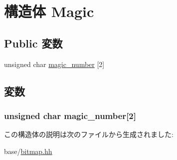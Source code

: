 \hypertarget{structBitmap_1_1Magic}{
\section{構造体 Magic}
\label{structBitmap_1_1Magic}
}
\subsection*{Public 変数}
\begin{DoxyCompactItemize}
\item 
unsigned char \hyperlink{structBitmap_1_1Magic_abf0eddaf2da6ff8f64723009a8f6f5c7}{magic\_\-number} \mbox{[}2\mbox{]}
\end{DoxyCompactItemize}


\subsection{変数}
\hypertarget{structBitmap_1_1Magic_abf0eddaf2da6ff8f64723009a8f6f5c7}{
\subsubsection[{magic\_\-number}]{\setlength{\rightskip}{0pt plus 5cm}unsigned char {\bf magic\_\-number}\mbox{[}2\mbox{]}}}
\label{structBitmap_1_1Magic_abf0eddaf2da6ff8f64723009a8f6f5c7}


この構造体の説明は次のファイルから生成されました:\begin{DoxyCompactItemize}
\item 
base/\hyperlink{bitmap_8hh}{bitmap.hh}\end{DoxyCompactItemize}
